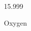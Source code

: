 \documentclass[12pt]{article}
\begin{document}
\hfill{}
\vfill
\begin{center}
  {\fontsize{50}{60}
  }

  \vspace{1em}

  15.999

Oxygen
\end{center}
\vfill
\end{document}
